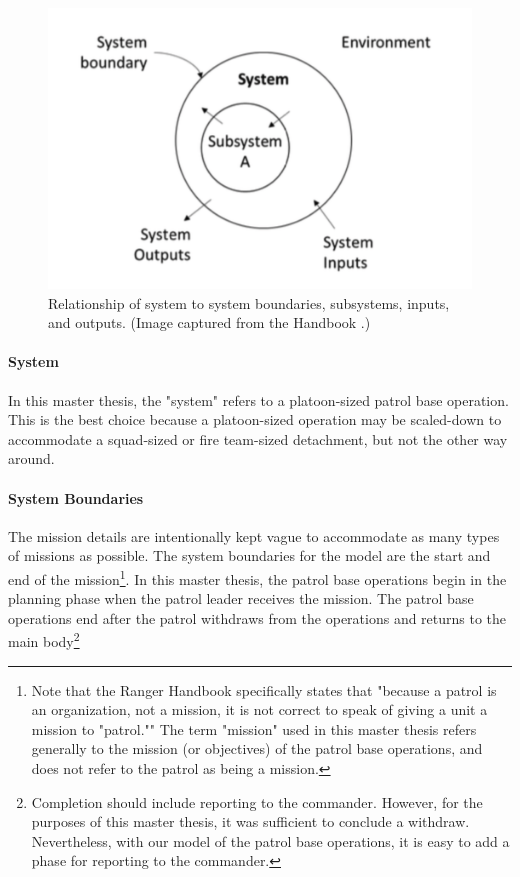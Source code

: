 \documentclass[../../main/main.tex]{subfiles}
\begin{document}
\begin{figure}[h]
\includegraphics[width=\linewidth]{../figures/system}
\caption{\label{system} Relationship of system to system boundaries, subsystems, inputs, and outputs. (Image captured from the  Handbook \cite{stpa}.)}
\end{figure}
\paragraph*{System}
In this master thesis, the "system" refers to a platoon-sized patrol base operation.  This is the best choice because a platoon-sized operation may be scaled-down to accommodate a squad-sized or fire team-sized detachment, but not the other way around. 

\paragraph*{System Boundaries}
The mission details are intentionally kept vague to accommodate as many types of missions as possible.  The system boundaries for the model are the start and end of the mission\footnote{Note that the Ranger Handbook specifically states that "because a patrol is an organization, not a mission, it is not correct to speak of giving a unit a mission to "patrol.""  The term "mission" used in this master thesis refers generally to the mission (or objectives) of the patrol base operations, and does not refer to the patrol as being a mission.}. In this master thesis, the patrol base operations begin in the planning phase when the patrol leader receives the mission.  The patrol base operations end after the patrol withdraws from the operations and returns to the main body\footnote{Completion should include reporting to the commander.  However, for the purposes of this master thesis, it was sufficient to conclude a withdraw.  Nevertheless, with our model of the patrol base operations, it is easy to add a phase for reporting to the commander.}
\end{document}
